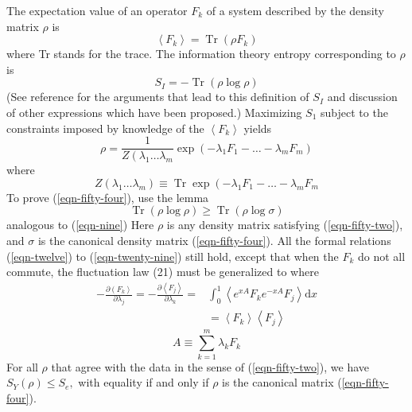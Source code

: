 \documentclass[]{article}
\begin{document}
The expectation value of an operator $F _{ k }$ of a system described by the density matrix $\rho$ is
\begin{equation}
\left\langle F_{k}\right\rangle=\operatorname{Tr}\left(\rho F_{k}\right) \label{eqn-fifty-two}
\end{equation}
where Tr stands for the trace. The information theory entropy corresponding to $\rho$ is
\begin{equation}
S_{I}=-\operatorname{Tr}(\rho \log \rho)
\end{equation}
(See reference\citep{Jaynes-information-II-57} for the arguments that lead to this definition of $S_{I}$ and discussion of other expressions which have been proposed.) Maximizing $S_{1}$ subject to the constraints imposed by knowledge of the $\left\langle F _{ k }\right\rangle$ yields
\begin{equation}
\rho=\frac{1}{Z\left(\lambda_{1} \ldots \lambda_{m}\right.} \exp \left(-\lambda_{1} F_{1}-\ldots-\lambda_{m} F_{m}\right) \label{eqn-fifty-four}
\end{equation}
where
\begin{equation}
Z \left(\lambda_{1} \ldots \lambda_{ m }\right) \equiv \operatorname{Tr} \exp \left(-\lambda_{1} F _{1}-\ldots-\lambda_{ m } F _{ m }\right.
\end{equation}
To prove (\ref{eqn-fifty-four}), use the lemma
\begin{equation}
\operatorname{Tr}(\rho \log \rho) \geq \operatorname{Tr}(\rho \log \sigma)
\end{equation}
analogous to (\ref{eqn-nine}) Here $\rho$ is any density matrix satisfying (\ref{eqn-fifty-two}), and $\sigma$ is the canonical density matrix (\ref{eqn-fifty-four}). All the formal relations
(\ref{eqn-twelve}) to (\ref{eqn-twenty-nine}) still hold, except that when the $F_{k}$ do not all commute, the fluctuation law (21) must be generalized to
where
\begin{equation}
\begin{aligned}
-\frac{\partial\left(F_{k}\right\rangle}{\partial \lambda_{j}}=-\frac{\partial\left\langle F_{j}\right\rangle}{\partial \lambda_{ k }}=& \int_{0}^{1}\left\langle e^{x A} F_{k} e^{-x A} F_{j}\right\rangle\text{d}x \\
&=\left\langle F_{k}\right\rangle\left\langle F_{j}\right\rangle
\end{aligned}
\end{equation}
\begin{equation}
A \equiv \sum_{ k =1}^{ m } \lambda_{ k } F _{ k }
\end{equation}
For all $\rho$ that agree with the data in the sense of (\ref{eqn-fifty-two}), we have $S_{Y}(\rho) \leq S_{e},$ with equality if and only if $\rho$ is the canonical matrix (\ref{eqn-fifty-four}).
\end{document}
